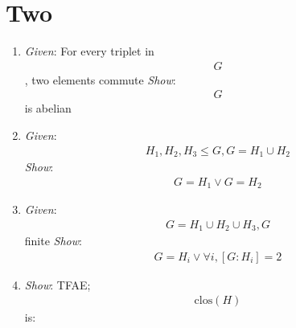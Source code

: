 \hypertarget{two}{%
\section{Two}\label{two}}

\begin{enumerate}
\def\labelenumi{\arabic{enumi}.}
\item
  \emph{Given}: For every triplet in \begin{align*}G\end{align*}, two
  elements commute \emph{Show}: \begin{align*}G\end{align*} is abelian
\item
  \emph{Given}:
  \begin{align*}H_1, H_2, H_3 \leq G, G = H_1 \cup H_2\end{align*}
  \emph{Show}: \begin{align*}G=H_1 \vee G=H_2\end{align*}
\item
  \emph{Given}: \begin{align*}G=H_1 \cup H_2 \cup H_3, G\end{align*}
  finite \emph{Show}:
  \begin{align*}G=H_i \vee \forall i, [G:H_i] = 2\end{align*}
\item
  \emph{Show}: TFAE; \begin{align*}\text{clos}(H)\end{align*} is:


\end{enumerate}
